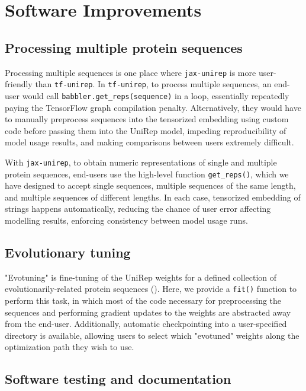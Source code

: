 \documentclass{bioinfo}
\begin{document}
\section{Software Improvements}

\subsection{Processing multiple protein sequences}

Processing multiple sequences is one place where \verb|jax-unirep|
is more user-friendly than \verb|tf-unirep|.
In \verb|tf-unirep|, to process multiple sequences,
an end-user would call \verb|babbler.get_reps(sequence)| in a loop,
essentially repeatedly paying the TensorFlow graph compilation penalty.
Alternatively, they would have to manually preprocess sequences
into the tensorized embedding using custom code
before passing them into the UniRep model,
impeding reproducibility of model usage results,
and making comparisons between users extremely difficult.

With \verb|jax-unirep|,
to obtain numeric representations of single and multiple protein sequences,
end-users use the high-level function \verb|get_reps()|,
which we have designed to accept single sequences,
multiple sequences of the same length, and
multiple sequences of different lengths.
In each case, tensorized embedding of strings happens automatically,
reducing the chance of user error affecting modelling results,
enforcing consistency between model usage runs.

\subsection{Evolutionary tuning}

"Evotuning" is fine-tuning of the UniRep weights
for a defined collection
of evolutionarily-related protein sequences (\cite{alley2019unified}).
Here, we provide a \verb|fit()| function to perform this task,
in which most of the code necessary for preprocessing the sequences
and performing gradient updates to the weights
are abstracted away from the end-user.
Additionally, automatic checkpointing
into a user-specified directory is available,
allowing users to select
which "evotuned" weights along the optimization path
they wish to use.

\subsection{Software testing and documentation}
\end{document}
